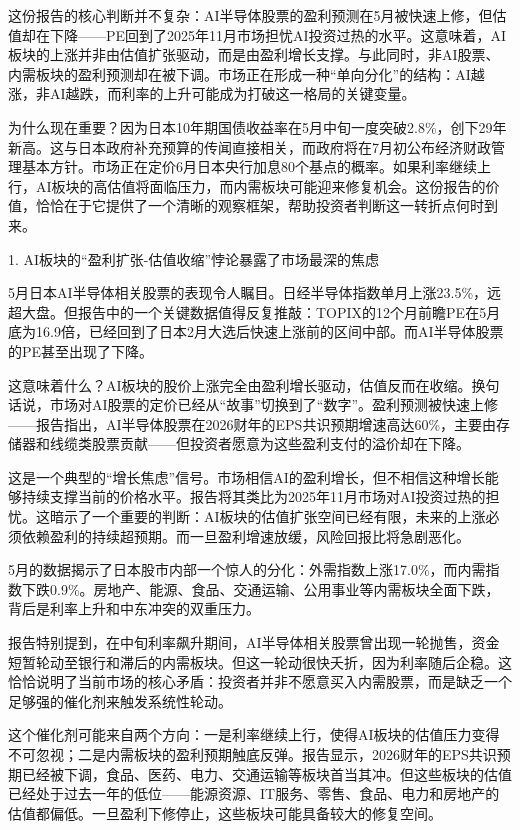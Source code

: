 \documentclass[11pt]{ctexart}
\begin{document}
这份报告的核心判断并不复杂：AI半导体股票的盈利预测在5月被快速上修，但估值却在下降——PE回到了2025年11月市场担忧AI投资过热的水平。这意味着，AI板块的上涨并非由估值扩张驱动，而是由盈利增长支撑。与此同时，非AI股票、内需板块的盈利预测却在被下调。市场正在形成一种“单向分化”的结构：AI越涨，非AI越跌，而利率的上升可能成为打破这一格局的关键变量。

为什么现在重要？因为日本10年期国债收益率在5月中旬一度突破2.8\%，创下29年新高。这与日本政府补充预算的传闻直接相关，而政府将在7月初公布经济财政管理基本方针。市场正在定价6月日本央行加息80个基点的概率。如果利率继续上行，AI板块的高估值将面临压力，而内需板块可能迎来修复机会。这份报告的价值，恰恰在于它提供了一个清晰的观察框架，帮助投资者判断这一转折点何时到来。

1. AI板块的“盈利扩张-估值收缩”悖论暴露了市场最深的焦虑

5月日本AI半导体相关股票的表现令人瞩目。日经半导体指数单月上涨23.5\%，远超大盘。但报告中的一个关键数据值得反复推敲：TOPIX的12个月前瞻PE在5月底为16.9倍，已经回到了日本2月大选后快速上涨前的区间中部。而AI半导体股票的PE甚至出现了下降。

这意味着什么？AI板块的股价上涨完全由盈利增长驱动，估值反而在收缩。换句话说，市场对AI股票的定价已经从“故事”切换到了“数字”。盈利预测被快速上修——报告指出，AI半导体股票在2026财年的EPS共识预期增速高达60\%，主要由存储器和线缆类股票贡献——但投资者愿意为这些盈利支付的溢价却在下降。

这是一个典型的“增长焦虑”信号。市场相信AI的盈利增长，但不相信这种增长能够持续支撑当前的价格水平。报告将其类比为2025年11月市场对AI投资过热的担忧。这暗示了一个重要的判断：AI板块的估值扩张空间已经有限，未来的上涨必须依赖盈利的持续超预期。而一旦盈利增速放缓，风险回报比将急剧恶化。

5月的数据揭示了日本股市内部一个惊人的分化：外需指数上涨17.0\%，而内需指数下跌0.9\%。房地产、能源、食品、交通运输、公用事业等内需板块全面下跌，背后是利率上升和中东冲突的双重压力。

报告特别提到，在中旬利率飙升期间，AI半导体相关股票曾出现一轮抛售，资金短暂轮动至银行和滞后的内需板块。但这一轮动很快夭折，因为利率随后企稳。这恰恰说明了当前市场的核心矛盾：投资者并非不愿意买入内需股票，而是缺乏一个足够强的催化剂来触发系统性轮动。

这个催化剂可能来自两个方向：一是利率继续上行，使得AI板块的估值压力变得不可忽视；二是内需板块的盈利预期触底反弹。报告显示，2026财年的EPS共识预期已经被下调，食品、医药、电力、交通运输等板块首当其冲。但这些板块的估值已经处于过去一年的低位——能源资源、IT服务、零售、食品、电力和房地产的估值都偏低。一旦盈利下修停止，这些板块可能具备较大的修复空间。
\end{document}
